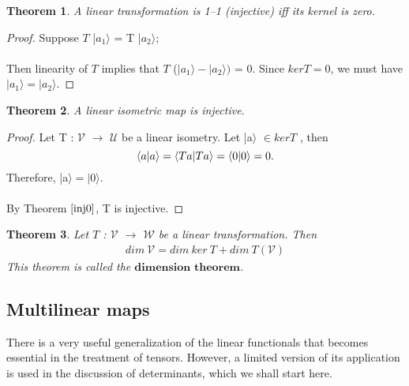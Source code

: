 \documentclass[12pt,a4paper]{article}
\newtheorem{thm}{Theorem}
\begin{document}
\begin{thm} \label{inj0}
A linear transformation is 1–1 (injective) iff its kernel is
zero.
\end{thm}
\begin{proof}
Suppose $T$ |$a_1\rangle$ = T |$a_2\rangle$; \\\\Then linearity of $T$ implies that $T$ ($|a_1\rangle - |a_2\rangle)$ = 0. Since $ker T = 0$, we must have $|a_1\rangle = |a_2 \rangle$.
\end{proof}
\begin{thm} \label{inj}
A linear isometric map is injective.
\end{thm}
\begin{proof}
Let T : $\mathcal{V}$ $\to$ $\mathcal{U}$ be a linear isometry. Let |a$\rangle$ $\in kerT$ , then
\begin{equation}
\braket{a | a} = \braket{Ta | Ta} = \braket{0|0} = 0.
\end{equation}
Therefore, |a$\rangle = |0 \rangle$.\\\\
By Theorem $\ref{inj0}$, T is injective.
\end{proof}
\begin{thm} \label{dimthm}
Let $T$ : $\mathcal{V}$ $\to$ $\mathcal{W}$ be a linear transformation. Then
\begin{align*}
dim\ \mathcal{V} = dim\ ker\ T + dim\ T(\mathcal{V})
\end{align*}
This theorem is called the $\textbf{dimension theorem}$.
\end{thm}
\subsection{Multilinear maps}
There is a very useful generalization of the linear functionals that becomes essential in the treatment of tensors. However, a limited version of its application is used in the discussion of determinants, which we shall start here.
\end{document}
